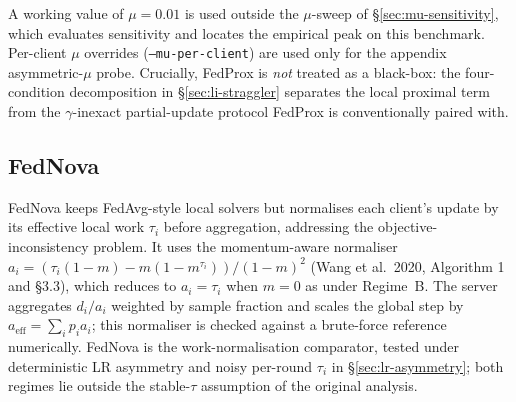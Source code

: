 \documentclass[11pt,a4paper]{report}
\begin{document}
A working value of $\mu = 0.01$ is used outside the $\mu$-sweep of
§\ref{sec:mu-sensitivity}, which evaluates sensitivity and locates the
empirical peak on this benchmark. Per-client $\mu$ overrides
(\texttt{--mu-per-client}) are used only for the appendix
asymmetric-$\mu$ probe. Crucially, FedProx is \emph{not} treated as a
black-box: the four-condition decomposition in §\ref{sec:li-straggler}
separates the local proximal term from the $\gamma$-inexact
partial-update protocol FedProx is conventionally paired with.

\subsection{FedNova}

FedNova \citep{wang2020fednova} keeps FedAvg-style local solvers but
normalises each client's update by its effective local work $\tau_i$
before aggregation, addressing the objective-inconsistency problem.
It uses the momentum-aware normaliser $a_i = (\tau_i(1-m) - m(1-m^{\tau_i})) /
(1-m)^{2}$ (Wang et al.\ 2020, Algorithm 1 and §3.3), which reduces to
$a_i = \tau_i$ when $m = 0$ as under Regime~B. The server aggregates
$d_i / a_i$ weighted by sample fraction and scales the global step by
$a_{\textrm{eff}} = \sum_i p_i a_i$; this normaliser is checked against a
brute-force reference numerically. FedNova is the work-normalisation
comparator, tested under deterministic LR asymmetry and noisy per-round
$\tau_i$ in §\ref{sec:lr-asymmetry}; both regimes lie outside the
stable-$\tau$ assumption of the original analysis.
\end{document}
